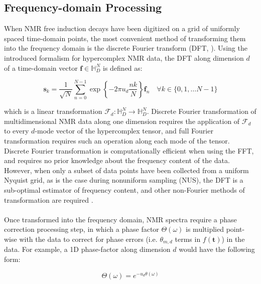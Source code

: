 \subsection{Frequency-domain Processing}

\begin{doublespace}
When NMR free induction decays have been digitized on a grid of uniformly
spaced time-domain points, the most convenient method of transforming them
into the frequency domain is the discrete Fourier transform (DFT,
\cite{bretthorst:cmr2008,schuyler:jmr2013}). Using the introduced formalism for
hypercomplex NMR data, the DFT along dimension $d$ of a time-domain vector
$\mathbf{f} \in \mathbb{H}_D^N$ is defined as:

\begin{equation}
\mathbf{s}_k = \frac{1}{\sqrt{N}} \sum_{n=0}^{N-1}
  \exp\left\{ -2 \pi u_d \frac{n k}{N} \right\}
  \mathbf{f}_n
  \quad \forall k \in \{ 0, 1, \dots N-1 \}
\end{equation}

which is a linear transformation
$\mathcal{F}_d : \mathbb{H}_D^N \to \mathbb{H}_D^N$. Discrete Fourier
transformation of multidimensional NMR data along one dimension requires the
application of $\mathcal{F}_d$ to every $d$-mode vector of the hypercomplex
tensor, and full Fourier transformation requires such an operation along each
mode of the tensor. Discrete Fourier transformation is computationally
efficient when using the FFT, and requires no prior knowledge about the
frequency content of the data. However, when only a subset of data points
have been collected from a uniform Nyquist grid, as is the case during
nonuniform sampling (NUS), the DFT is a sub-optimal estimator of frequency
content, and other non-Fourier methods of transformation are required
\cite{bretthorst:cmr2008,mobli:pnmrs2014}.
\\\\
Once transformed into the frequency domain, NMR spectra require a phase
correction processing step, in which a phase factor $\Theta(\omega)$ is
multiplied point-wise with the data to correct for phase errors
(i.e. $\theta_{m,d}$ terms in $f(\mathbf{t})$) in the data. For example, a
1D phase-factor along dimension $d$ would have the following form:

\begin{equation}
\Theta(\omega) = e^{ -u_d \theta(\omega) }
\end{equation}


\end{doublespace}
